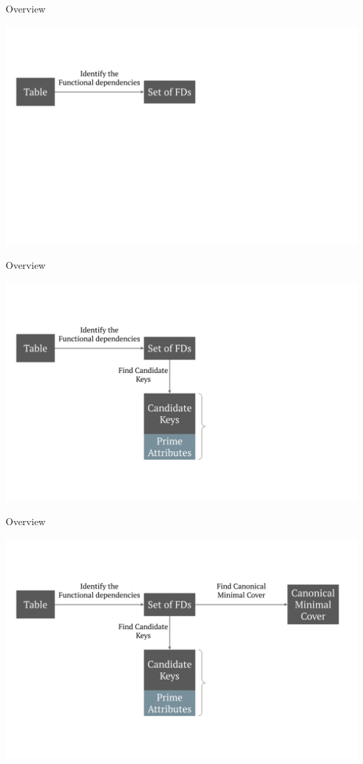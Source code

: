\documentclass[UTF8]{beamer}
\begin{document}
\begin{frame}{Overview}
\begin{center}
    \includegraphics[width = 1\linewidth]{fd_norm_images/02.png}
\end{center}
\end{frame}

\begin{frame}{Overview}
\begin{center}
    \includegraphics[width = 1\linewidth]{fd_norm_images/03.png}
\end{center}
\end{frame}

\begin{frame}{Overview}
\begin{center}
    \includegraphics[width = 1\linewidth]{fd_norm_images/04.png}
\end{center}
\end{frame}
\end{document}
